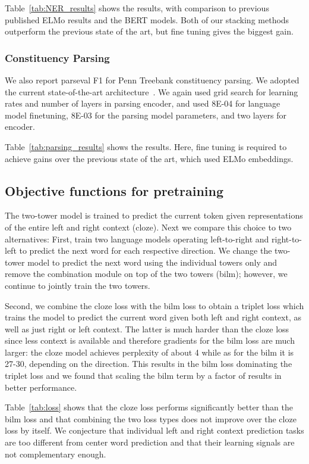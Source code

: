 \documentclass[11pt,a4paper]{article}
\begin{document}
Table~\ref{tab:NER_results} shows the results, with comparison to previous published ELMo results \citep{peters2018acl} and the BERT models. Both of our stacking methods outperform the previous state of the art, but fine tuning gives the biggest gain. 


\subsubsection{Constituency Parsing}
\label{sec:parsing}
We also report parseval F1 for Penn Treebank constituency parsing. We adopted the current state-of-the-art architecture~\cite{kitaev2018acl}. We again used grid search for learning rates and number of layers in parsing encoder, and used 8E-04 for language model finetuning, 8E-03 for the parsing model parameters, and two layers for encoder. 

Table~\ref{tab:parsing_results} shows the results. Here, fine tuning is required to achieve gains over the previous state of the art, which used ELMo embeddings. 

\subsection{Objective functions for pretraining}
\label{sec:losses}

The two-tower model is trained to predict the current token given representations of the entire left and right context (cloze).
Next we compare this choice to two alternatives:
First, \citet{peters2018acl} train two language models operating left-to-right and right-to-left to predict the next word for each respective direction.
We change the two-tower model to predict the next word using the individual towers only and remove the combination module on top of the two towers (bilm); however, we continue to jointly train the two towers.

Second, we combine the cloze loss with the bilm loss to obtain a triplet loss which trains the model to predict the current word given both left and right context, as well as just right or left context.
The latter is much harder than the cloze loss since less context is available and therefore gradients for the bilm loss are much larger: the cloze model achieves perplexity of about 4 while as for the bilm it is 27-30, depending on the direction.
This results in the bilm loss dominating the triplet loss and we found that scaling the bilm term by a factor of  results in better performance.

Table~\ref{tab:loss} shows that the cloze loss performs significantly better than the bilm loss and that combining the two loss types does not improve over the cloze loss by itself.
We conjecture that individual left and right context prediction tasks are too different from center word prediction and that their learning signals are not complementary enough.
\end{document}
